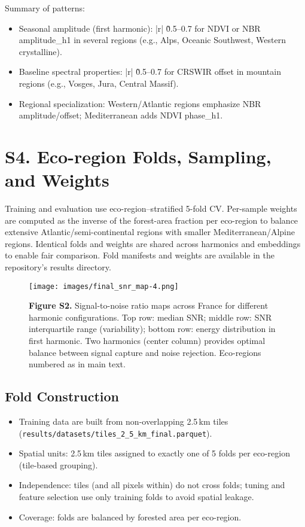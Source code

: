 \documentclass[utf8]{frontiers_suppmat}
\begin{document}
Summary of patterns:
\begin{itemize}
  \item Seasonal amplitude (first harmonic): |r| \~0.5–0.7 for NDVI or NBR amplitude\_h1 in several regions (e.g., Alps, Oceanic Southwest, Western crystalline).
  \item Baseline spectral properties: |r| \~0.5–0.7 for CRSWIR offset in mountain regions (e.g., Vosges, Jura, Central Massif).
  \item Regional specialization: Western/Atlantic regions emphasize NBR amplitude/offset; Mediterranean adds NDVI phase\_h1.
\end{itemize}

\section{S4. Eco-region Folds, Sampling, and Weights}

Training and evaluation use eco-region–stratified 5-fold CV. Per-sample weights are computed as the inverse of the forest-area fraction per eco-region to balance extensive Atlantic/semi-continental regions with smaller Mediterranean/Alpine regions. Identical folds and weights are shared across harmonics and embeddings to enable fair comparison. Fold manifests and weights are available in the repository’s results directory.

\begin{figure}[H]
    \centering
    \texttt{[image: images/final\_snr\_map-4.png]}
    \caption{\textbf{Figure S2.} Signal-to-noise ratio maps across France for different harmonic configurations. Top row: median SNR; middle row: SNR interquartile range (variability); bottom row: energy distribution in first harmonic. Two harmonics (center column) provides optimal balance between signal capture and noise rejection. Eco-regions numbered as in main text.}
    \label{fig:snr_maps}
\end{figure}



\subsection{Fold Construction}
\begin{itemize}
  \item Training data are built from non-overlapping 2.5\,km tiles (\texttt{results/datasets/tiles\_2\_5\_km\_final.parquet}).
  \item Spatial units: 2.5\,km tiles assigned to exactly one of 5 folds per eco-region (tile-based grouping).
  \item Independence: tiles (and all pixels within) do not cross folds; tuning and feature selection use only training folds to avoid spatial leakage.
  \item Coverage: folds are balanced by forested area per eco-region.
\end{itemize}
\end{document}
